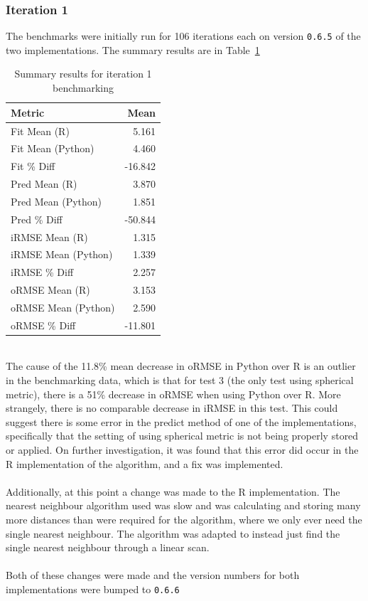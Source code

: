 \documentclass[10pt]{article}
\begin{document}
\subsubsection{Iteration 1}
The benchmarks were initially run for 106 iterations each on version \texttt{0.6.5} of the two implementations. The summary results are in Table~\ref{tab:iter1}
\begin{table}[h]
\begin{center}
\begin{tabular}{|l|r|}
\hline
\textbf{Metric} & \textbf{Mean}\\
\hline\hline
Fit Mean (R) & 5.161\\
\hline
Fit Mean (Python) & 4.460\\
\hline
Fit \% Diff & -16.842\\
\hline\hline
Pred Mean (R) & 3.870\\
\hline
Pred Mean (Python) & 1.851\\
\hline
Pred \% Diff & -50.844\\
\hline\hline
iRMSE Mean (R) & 1.315\\
\hline
iRMSE Mean (Python) & 1.339\\
\hline
iRMSE \% Diff & 2.257\\
\hline\hline
oRMSE Mean (R) & 3.153\\
\hline
oRMSE Mean (Python) & 2.590\\
\hline
oRMSE \% Diff & -11.801\\
\hline
\end{tabular}
\caption{Summary results for iteration 1 benchmarking}
\label{tab:iter1}
\end{center}
\end{table}
\\
The cause of the 11.8\% mean decrease in oRMSE in Python over R is an outlier in the benchmarking data, which is that for test 3 (the only test using spherical metric), there is a 51\% decrease in oRMSE when using Python over R. More strangely, there is no comparable decrease in iRMSE in this test. This could suggest there is some error in the predict method of one of the implementations, specifically that the setting of using spherical metric is not being properly stored or applied. On further investigation, it was found that this error did occur in the R implementation of the algorithm, and a fix was implemented.
\\\\
Additionally, at this point a change was made to the R implementation. The nearest neighbour algorithm used was slow and was calculating and storing many more distances than were required for the algorithm, where we only ever need the single nearest neighbour. The algorithm was adapted to instead just find the single nearest neighbour through a linear scan.\\\\
Both of these changes were made and the version numbers for both implementations were bumped to \texttt{0.6.6}
\end{document}
